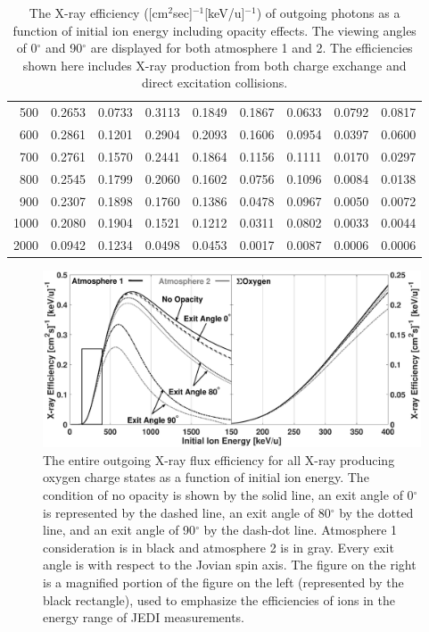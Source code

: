 \documentclass[draft]{agujournal2018}
\begin{document}
\begin{table}[ht]
\begin{tabular}{r|c|c|c|c|c|c|c|c}
    500      & 0.2653 & 0.0733 & 0.3113	& 0.1849 & 0.1867 & 0.0633 & 0.0792 & 0.0817 \\
    600      & 0.2861 & 0.1201 & 0.2904	& 0.2093 & 0.1606 & 0.0954 & 0.0397 & 0.0600 \\
    700      & 0.2761 & 0.1570 & 0.2441	& 0.1864 & 0.1156 & 0.1111 & 0.0170 & 0.0297 \\
    800      & 0.2545 & 0.1799 & 0.2060	& 0.1602 & 0.0756 & 0.1096 & 0.0084 & 0.0138 \\
    900      & 0.2307 & 0.1898 & 0.1760	& 0.1386 & 0.0478 & 0.0967 & 0.0050 & 0.0072 \\
    1000     & 0.2080 & 0.1904 & 0.1521	& 0.1212 & 0.0311 & 0.0802 & 0.0033 & 0.0044 \\
    2000     & 0.0942 & 0.1234 & 0.0498	& 0.0453 & 0.0017 & 0.0087 & 0.0006 & 0.0006 \\
    \hline
    \end{tabular}
    \caption{The X-ray efficiency ([cm$^2$sec]$^{-1}$[keV/u]$^{-1}$) of outgoing photons as a function of initial ion energy including opacity effects. The viewing angles of 0$^\circ$ and 90$^\circ$ are displayed for both atmosphere 1 and 2. The efficiencies shown here includes X-ray production from both charge exchange and direct excitation collisions.}
    \label{tab:XrayEff}
\end{table}

\begin{figure}[ht]
    \centering
    \includegraphics[width=\textwidth]{Figures/OxyXrayEff2.eps}
    \caption{The entire outgoing X-ray flux efficiency for all X-ray producing oxygen charge states as a function of initial ion energy. The condition of no opacity is shown by the solid line, an exit angle of 0$^{\circ}$ is represented by the dashed line, an exit angle of 80$^{\circ}$ by the dotted line, and an exit angle of 90$^{\circ}$ by the dash-dot line. Atmosphere 1 consideration is in black and atmosphere 2 is in gray. Every exit angle is with respect to the Jovian spin axis. The figure on the right is a magnified portion of the figure on the left (represented by the black rectangle), used to emphasize the efficiencies of ions in the energy range of JEDI measurements.}
    \label{fig:OxyXrayEff}
\end{figure}
\end{document}
